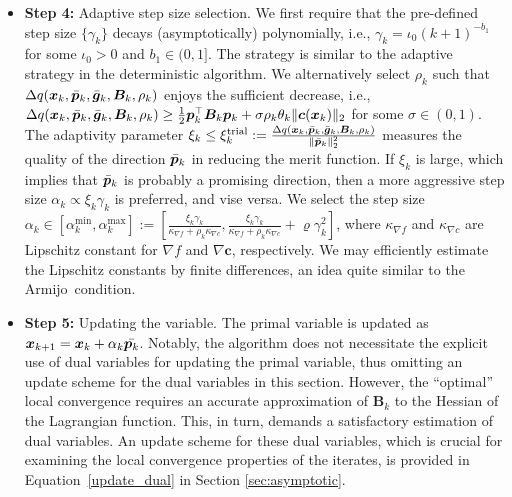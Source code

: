 \documentclass[aos]{imsart}
\numberwithin{equation}{section}
\theoremstyle{plain}
\begin{document}
\begin{itemize}
    \item \textbf{Step 4:} Adaptive step size selection. We first require that the pre-defined step size $\{\gamma_k\}$ decays (asymptotically) polynomially, i.e., $\gamma_k = \iota_0 \left(k+1 \right)^{-b_1}$ for some $\iota_0 > 0$ and $b_1 \in (0,1]$. 
    The strategy is similar to the adaptive strategy in the deterministic algorithm. We alternatively select $\rho_k$ such that $\Delta q(\bm{x}_k,\Bar{\bm{p}}_k, \Bar{\bm{g}}_k, \bm{B}_k,\rho_k)$ enjoys the sufficient decrease, i.e., $\Delta q(\bm{x}_k,\Bar{\bm{p}}_k, \Bar{\bm{g}}_k, \bm{B}_k,\rho_k) \geq \frac{1}{2} \bm{p}_k^{\top} \bm{B}_k \bm{p}_k + \sigma \rho_k \theta_k \|\bm{c}(\bm{x}_k)\|_2$ for some $\sigma \in (0,1)$. The adaptivity parameter $\xi_k \leq \xi_k^{\text{trial}} := \frac{\Delta q(\bm{x}_k,\Bar{\bm{p}}_k, \Bar{\bm{g}}_k,\bm{B}_k,\rho_k)}{\|\Bar{\bm{p}}_k\|_2^2}$ measures the quality of the direction $\Bar{\bm{p}}_k$ in reducing the merit function. If $\xi_k$ is large, which implies that $\Bar{\bm{p}}_k$ is probably a promising direction, then a more aggressive step size $\alpha_k \propto \xi_k \gamma_k$ is preferred, and vise versa. We select the step size  $\alpha_k \in \left[\alpha_k^{\text{min}}, \alpha_k^{\max} \right] :=  \left[ \frac{ \xi_{k}\gamma_k}{\kappa_{\nabla f} + \rho_k \kappa_{\nabla c}} , \frac{ \xi_{k}\gamma_k}{\kappa_{\nabla f} + \rho_k \kappa_{\nabla c}} + \varrho \gamma_k^2 \right]$, where $\kappa_{\nabla f}$ and $\kappa_{\nabla c}$ are Lipschitz constant for $\nabla f$ and $\nabla \bm{c}$, respectively. We may efficiently estimate the Lipschitz constants by finite differences, an idea quite similar to the Armijo~condition.

    \item \textbf{Step 5:} Updating the variable. The primal variable is updated as $\bm{x}_{k+1} = \bm{x}_k + \alpha_k \Bar{\bm{p}_k}$. 
    Notably, the algorithm does not necessitate the explicit use of dual variables for updating the primal variable, thus omitting an update scheme for the dual variables in this section.
    However, the ``optimal'' local convergence requires an accurate approximation of $\bm{B}_k$ to the Hessian of the Lagrangian function. This, in turn, demands a satisfactory estimation of dual variables. 
    An update scheme for these dual variables, which is crucial for examining the local convergence properties of the iterates, is provided in Equation~\eqref{update_dual} in Section \ref{sec:asymptotic}.
\end{itemize}
\end{document}
